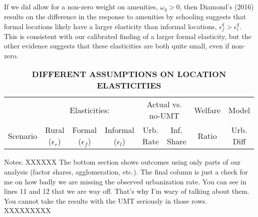 \documentclass[10pt]{article}
\begin{document}
If we did allow for a non-zero weight on amenities, $\omega_q >0$, then Diamond's (2016) results on the difference in the response to amenities by schooling suggests that formal locations likely have a larger elasticity than informal locations, $\epsilon^q_f > \epsilon^q_l$. This is consistent with our calibrated finding of a larger formal elasticity, but the other evidence suggests that these elasticities are both quite small, even if non-zero.

\begin{table}[htb]
\begin{center}
\begin{footnotesize}
\caption{\textbf{DIFFERENT ASSUMPTIONS ON LOCATION ELASTICITIES}} \label{tab_elasticity}
\begin{tabular}{lccccccc}
\midrule
         & \multicolumn{3}{c}{Elasticities:} & \multicolumn{2}{c}{Actual vs. no-UMT} &Welfare & Model  \\ \cmidrule(lr){2-4} \cmidrule(lr){5-6} 
Scenario & Rural ($\epsilon_r$) & Formal ($\epsilon_f$) & Informal ($\epsilon_l$) & Urb. Rate & Inf. Share & Ratio & Urb. Diff \\ \midrule

\midrule
\end{tabular}
\end{footnotesize}
\end{center}
Notes: XXXXXX The bottom section shows outcomes using only parts of our analysis (factor shares, agglomeration, etc.). The final column is just a check for me on how badly we are missing the observed urbanization rate. You can see in lines 11 and 12 that we are way off. That's why I'm wary of talking about them. You cannot take the results with the UMT seriously in those rows. XXXXXXXXX
\end{table}
\end{document}
